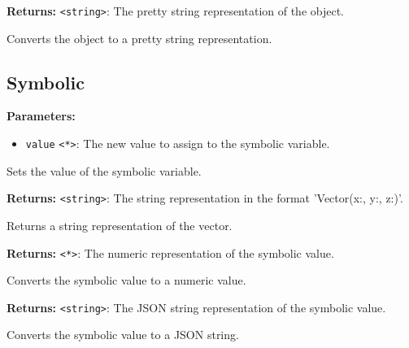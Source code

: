 \documentclass[12pt,a4paper]{article}
\begin{document}
\noindent \textbf{Returns:} \texttt{<string>}: The pretty string representation of the object.

\noindent Converts the object to a pretty string representation.


\subsection{Symbolic}
\vspace{5mm}
\noindent {}


\noindent \textbf{Parameters:}
\begin{itemize}
  \item \texttt{value} \texttt{<*>}: The new value to assign to the symbolic variable.
\end{itemize}

\noindent Sets the value of the symbolic variable.

\vspace{5mm}
\noindent {}


\noindent \textbf{Returns:} \texttt{<string>}: The string representation in the format 'Vector(x:, y:, z:)'.

\noindent Returns a string representation of the vector.

\vspace{5mm}
\noindent {}


\noindent \textbf{Returns:} \texttt{<*>}: The numeric representation of the symbolic value.

\noindent Converts the symbolic value to a numeric value.

\vspace{5mm}
\noindent {}


\noindent \textbf{Returns:} \texttt{<string>}: The JSON string representation of the symbolic value.

\noindent Converts the symbolic value to a JSON string.
\end{document}
